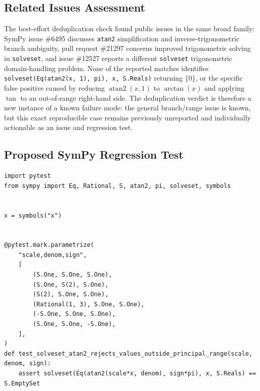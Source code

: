 \documentclass[11pt]{article}
\begin{document}
\subsection{Related Issues Assessment}

The best-effort deduplication check found public issues in the same broad
family: SymPy issue \#6495 discusses \texttt{atan2} simplification and
inverse-trigonometric branch ambiguity, pull request \#21297 concerns improved
trigonometric solving in \texttt{solveset}, and issue \#12527 reports a
different \texttt{solveset} trigonometric domain-handling problem. None of the
reported matches identifies
\texttt{solveset(Eq(atan2(x, 1), pi), x, S.Reals)} returning \(\{0\}\), or the
specific false positive caused by reducing \(\operatorname{atan2}(x,1)\) to
\(\arctan(x)\) and applying \(\tan\) to an out-of-range right-hand side. The
deduplication verdict is therefore a new instance of a known failure mode: the
general branch/range issue is known, but this exact reproducible case remains
previously unreported and individually actionable as an issue and regression
test.

\subsection{Proposed SymPy Regression Test}

\medskip

\begin{lstlisting}[style=bugpython]
import pytest
from sympy import Eq, Rational, S, atan2, pi, solveset, symbols


x = symbols("x")


@pytest.mark.parametrize(
    "scale,denom,sign",
    [
        (S.One, S.One, S.One),
        (S.One, S(2), S.One),
        (S(2), S.One, S.One),
        (Rational(1, 3), S.One, S.One),
        (-S.One, S.One, S.One),
        (S.One, S.One, -S.One),
    ],
)
def test_solveset_atan2_rejects_values_outside_principal_range(scale, denom, sign):
    assert solveset(Eq(atan2(scale*x, denom), sign*pi), x, S.Reals) == S.EmptySet
\end{lstlisting}
\end{document}
